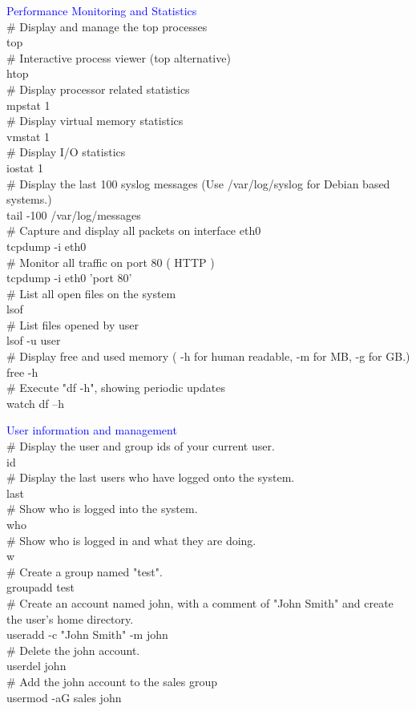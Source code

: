 \documentclass{article}
\begin{document}
\textcolor{blue}{Performance Monitoring and Statistics}\\
\noindent
\# Display and manage the top processes\\
top\\
\# Interactive process viewer (top alternative)\\
htop\\
\# Display processor related statistics\\
mpstat 1\\
\# Display virtual memory statistics\\
vmstat 1\\
\# Display I/O statistics\\
iostat 1\\
\# Display the last 100 syslog messages  (Use /var/log/syslog for Debian based systems.)\\
tail -100 /var/log/messages\\
\# Capture and display all packets on interface eth0\\
tcpdump -i eth0\\
\# Monitor all traffic on port 80 ( HTTP )\\
tcpdump -i eth0 'port 80'\\
\# List all open files on the system\\
lsof\\
\# List files opened by user\\
lsof -u user\\
\# Display free and used memory ( -h for human readable, -m for MB, -g for GB.)\\
free -h\\
\# Execute "df -h", showing periodic updates\\
watch df –h\\

\textcolor{blue}{User information and management }\\
\noindent
\# Display the user and group ids of your current user.\\
id\\
\# Display the last users who have logged onto the system.\\
last\\
\# Show who is logged into the system.\\
who\\
\# Show who is logged in and what they are doing.\\
w\\
\# Create a group named "test".\\
groupadd test\\
\# Create an account named john, with a comment of "John Smith" and create the user's home directory.\\
useradd -c "John Smith" -m john\\
\# Delete the john account.\\
userdel john\\
\# Add the john account to the sales group\\
usermod -aG sales john\\
\end{document}
